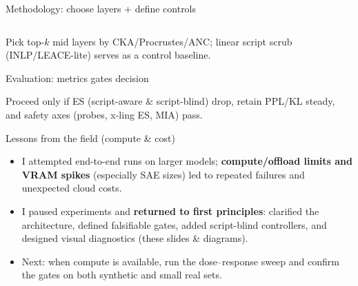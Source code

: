 \documentclass[aspectratio=169]{beamer}
\newcommand{\diagrampath}{../diagrams}
\begin{document}
\begin{frame}{Methodology: choose layers + define controls}
\begin{columns}[T,onlytextwidth]
\centering 
{}
\centering 
\end{columns}
\vspace{1mm}
\small Pick top-$k$ mid layers by CKA/Procrustes/ANC; linear script scrub (INLP/LEACE-lite) serves as a control baseline.
\end{frame}

\begin{frame}{Evaluation: metrics \textrightarrow{} gates \textrightarrow{} decision}
\centering

\vspace{1mm}
\small Proceed only if ES (script-aware \& script-blind) drop, retain PPL/KL steady, and safety axes (probes, x-ling ES, MIA) pass.
\end{frame}

\begin{frame}{Lessons from the field (compute \& cost)}
\small
\begin{itemize}
  \item I attempted end-to-end runs on larger models; \textbf{compute/offload limits and VRAM spikes} (especially SAE sizes) led to repeated failures and unexpected cloud costs.
  \item I paused experiments and \textbf{returned to first principles}: clarified the architecture, defined falsifiable gates, added script-blind controllers, and designed visual diagnostics (these slides & diagrams).
  \item Next: when compute is available, run the dose–response sweep and confirm the gates on both synthetic and small real sets.
\end{itemize}
\end{frame}
\end{document}
